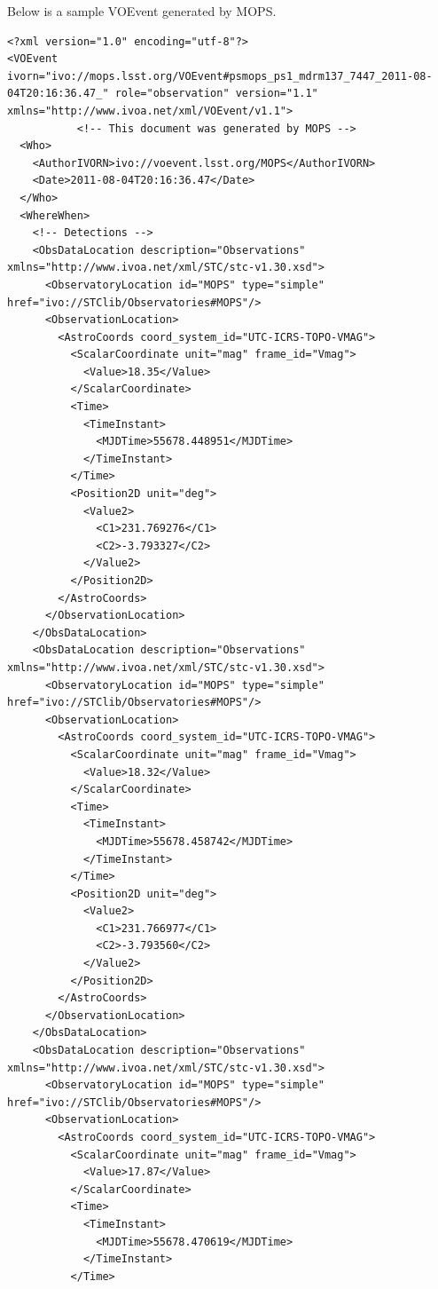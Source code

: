 \documentclass[panstarrs]{panstarrs}
\begin{document}
\begin{appendices}
Below is a sample VOEvent generated by MOPS.
\begin{verbatim}
<?xml version="1.0" encoding="utf-8"?>
<VOEvent ivorn="ivo://mops.lsst.org/VOEvent#psmops_ps1_mdrm137_7447_2011-08-04T20:16:36.47_" role="observation" version="1.1" xmlns="http://www.ivoa.net/xml/VOEvent/v1.1">
           <!-- This document was generated by MOPS -->
  <Who>
    <AuthorIVORN>ivo://voevent.lsst.org/MOPS</AuthorIVORN>
    <Date>2011-08-04T20:16:36.47</Date>
  </Who>
  <WhereWhen>
    <!-- Detections -->
    <ObsDataLocation description="Observations" xmlns="http://www.ivoa.net/xml/STC/stc-v1.30.xsd">
      <ObservatoryLocation id="MOPS" type="simple" href="ivo://STClib/Observatories#MOPS"/>
      <ObservationLocation>
        <AstroCoords coord_system_id="UTC-ICRS-TOPO-VMAG">
          <ScalarCoordinate unit="mag" frame_id="Vmag">
            <Value>18.35</Value>
          </ScalarCoordinate>
          <Time>
            <TimeInstant>
              <MJDTime>55678.448951</MJDTime>
            </TimeInstant>
          </Time>
          <Position2D unit="deg">
            <Value2>
              <C1>231.769276</C1>
              <C2>-3.793327</C2>
            </Value2>
          </Position2D>
        </AstroCoords>
      </ObservationLocation>
    </ObsDataLocation>
    <ObsDataLocation description="Observations" xmlns="http://www.ivoa.net/xml/STC/stc-v1.30.xsd">
      <ObservatoryLocation id="MOPS" type="simple" href="ivo://STClib/Observatories#MOPS"/>
      <ObservationLocation>
        <AstroCoords coord_system_id="UTC-ICRS-TOPO-VMAG">
          <ScalarCoordinate unit="mag" frame_id="Vmag">
            <Value>18.32</Value>
          </ScalarCoordinate>
          <Time>
            <TimeInstant>
              <MJDTime>55678.458742</MJDTime>
            </TimeInstant>
          </Time>
          <Position2D unit="deg">
            <Value2>
              <C1>231.766977</C1>
              <C2>-3.793560</C2>
            </Value2>
          </Position2D>
        </AstroCoords>
      </ObservationLocation>
    </ObsDataLocation>
    <ObsDataLocation description="Observations" xmlns="http://www.ivoa.net/xml/STC/stc-v1.30.xsd">
      <ObservatoryLocation id="MOPS" type="simple" href="ivo://STClib/Observatories#MOPS"/>
      <ObservationLocation>
        <AstroCoords coord_system_id="UTC-ICRS-TOPO-VMAG">
          <ScalarCoordinate unit="mag" frame_id="Vmag">
            <Value>17.87</Value>
          </ScalarCoordinate>
          <Time>
            <TimeInstant>
              <MJDTime>55678.470619</MJDTime>
            </TimeInstant>
          </Time>

\end{verbatim}
\end{appendices}
\end{document}
